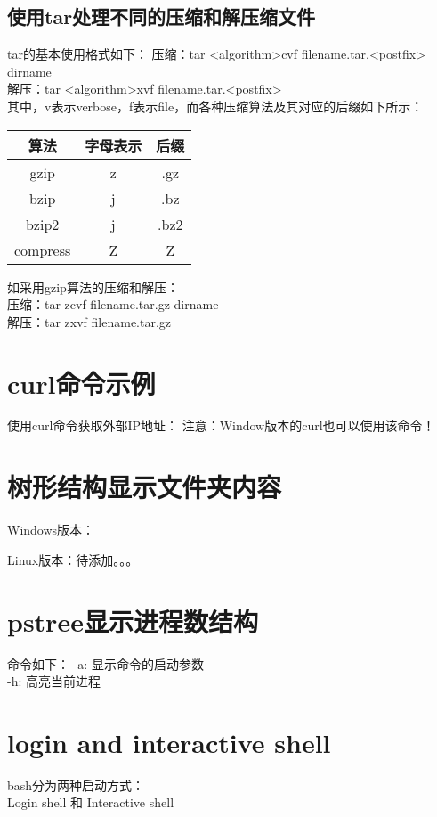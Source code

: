 ﻿\documentclass[a4paper,11pt]{article}
\begin{document}
  \subsection[使用tar处理不同的压缩和解压缩文件]{使用tar处理不同的压缩和解压缩文件}
  tar的基本使用格式如下：
  压缩：tar <algorithm>cvf filename.tar.<postfix> dirname\\
  解压：tar <algorithm>xvf filename.tar.<postfix>\\
  其中，v表示verbose，f表示file，而各种压缩算法及其对应的后缀如下所示：\par
  \begin{center}
  \begin{tabular}{ccc}
    \hline
    算法 & 字母表示 & 后缀\\ \hline
    gzip & z & .gz\\
    bzip & j & .bz\\
    bzip2 & j & .bz2\\
    compress & Z & Z\\ \hline
  \end{tabular}
  \end{center}
  如采用gzip算法的压缩和解压：\\
  压缩：tar zcvf filename.tar.gz dirname\\
  解压：tar zxvf filename.tar.gz


  \section[curl命令示例]{curl命令示例}
  使用curl命令获取外部IP地址：
  注意：Window版本的curl也可以使用该命令！


  \section[树形结构显示文件夹内容]{树形结构显示文件夹内容}
  Windows版本：

  Linux版本：待添加。。。


  \section[pstree显示进程数结构]{pstree显示进程数结构}
  命令如下：
  -a: 显示命令的启动参数\\
  -h: 高亮当前进程


  \section[login and interactive shell]{login and interactive shell}
  bash分为两种启动方式：\\
  Login shell 和 Interactive shell
\end{document}
